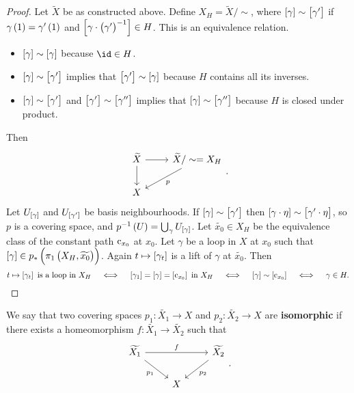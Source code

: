 \begin{proof}
Let $ \widetilde{X} $ be as constructed above. Define $ X_H = \widetilde{X} / \sim $, where $ \sbr{\gamma} \sim \sbr{\gamma'} $ if $ \gamma\br{1} = \gamma'\br{1} $ and $ \sbr{\gamma \cdot \br{\gamma'}^{-1}} \in H $. This is an equivalence relation.
\begin{itemize}
\item $ \sbr{\gamma} \sim \sbr{\gamma} $ because $ \id \in H $.
\item $ \sbr{\gamma} \sim \sbr{\gamma'} $ implies that $ \sbr{\gamma'} \sim \sbr{\gamma} $ because $ H $ contains all its inverses.
\item $ \sbr{\gamma} \sim \sbr{\gamma'} $ and $ \sbr{\gamma'} \sim \sbr{\gamma''} $ implies that $ \sbr{\gamma} \sim \sbr{\gamma''} $ because $ H $ is closed under product.
\end{itemize}
Then
$$
\begin{tikzcd}
\widetilde{X} \arrow{r} \arrow{d} & \widetilde{X} / \sim = X_H \arrow{dl}{p} \\
X &
\end{tikzcd}.
$$
Let $ U_{\sbr{\gamma}} $ and $ U_{\sbr{\gamma'}} $ be basis neighbourhoods. If $ \sbr{\gamma} \sim \sbr{\gamma'} $ then $ \sbr{\gamma \cdot \eta} \sim \sbr{\gamma' \cdot \eta} $, so $ p $ is a covering space, and $ p^{-1}\br{U} = \bigcup_\gamma U_{\sbr{\gamma}} $. Let $ \widetilde{x_0} \in X_H $ be the equivalence class of the constant path $ \mathrm{c}_{x_0} $ at $ x_0 $. Let $ \gamma $ be a loop in $ X $ at $ x_0 $ such that $ \sbr{\gamma} \in p_*\br{\pi_1\br{X_H, \widetilde{x_0}}} $. Again $ t \mapsto \sbr{\gamma_t} $ is a lift of $ \gamma $ at $ \widetilde{x_0} $. Then
$$ t \mapsto \sbr{\gamma_t} \ \text{is a loop in} \ X_H \quad \iff \quad \sbr{\gamma_1} = \sbr{\gamma} = \sbr{\c_{x_0}} \ \text{in} \ X_H \quad \iff \quad \sbr{\gamma} \sim \sbr{\c_{x_0}} \quad \iff \quad \gamma \in H. $$
\end{proof}

\begin{definition*}
We say that two covering spaces $ p_1 : \widetilde{X_1} \to X $ and $ p_2 : \widetilde{X_2} \to X $ are \textbf{isomorphic} if there exists a homeomorphism $ f : \widetilde{X_1} \to \widetilde{X_2} $ such that
$$
\begin{tikzcd}
\widetilde{X_1} \arrow{rr}{f} \arrow[swap]{dr}{p_1} & & \widetilde{X_2} \arrow{dl}{p_2} \\
& X &
\end{tikzcd}.
$$
\end{definition*}

